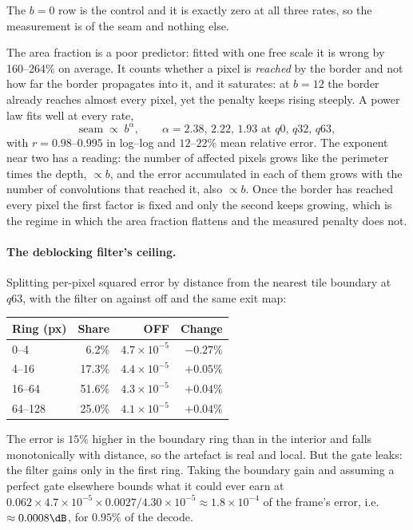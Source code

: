 The $b=0$ row is the control and it is exactly zero at all three rates, so the
measurement is of the seam and nothing else.

The area fraction is a poor predictor: fitted with one free scale it is wrong by
160--264\% on average. It counts whether a pixel is \emph{reached} by the border
and not how far the border propagates into it, and it saturates: at $b=12$
the border already reaches almost every pixel, yet the penalty keeps rising
steeply. A power law fits well at every rate,
\begin{equation}
\text{seam} \;\propto\; b^{\alpha}, \qquad
\alpha = 2.38,\, 2.22,\, 1.93 \text{ at } q0,\, q32,\, q63,
\end{equation}
with $r = 0.98$--$0.995$ in log--log and $12$--$22\%$ mean relative error. The
exponent near two has a reading: the number of affected pixels grows like the
perimeter times the depth, $\propto b$, and the error accumulated in each of them
grows with the number of convolutions that reached it, also $\propto b$. Once
the border has reached every pixel the first factor is fixed and only the second keeps
growing, which is the regime in which the area fraction flattens and the
measured penalty does not.

\paragraph{The deblocking filter's ceiling.} Splitting per-pixel squared error
by distance from the nearest tile boundary at $q63$, with the filter on against
off and
the same exit map:

\begin{center}
\begin{tabular}{lrrr}
\toprule
Ring (px) & Share & OFF & Change \\
\midrule
0--4    & 6.2\%  & $4.7\times10^{-5}$ & $-0.27\%$ \\
4--16   & 17.3\% & $4.4\times10^{-5}$ & $+0.05\%$ \\
16--64  & 51.6\% & $4.3\times10^{-5}$ & $+0.04\%$ \\
64--128 & 25.0\% & $4.1\times10^{-5}$ & $+0.04\%$ \\
\bottomrule
\end{tabular}
\end{center}

The error is $15\%$ higher in the boundary ring than in the interior and falls
monotonically with distance, so the artefact is real and local. But the gate
leaks: the filter gains only in the first ring. Taking the boundary gain and
assuming a perfect gate elsewhere bounds what it could ever earn at
$0.062 \times 4.7\!\times\!10^{-5} \times 0.0027 / 4.30\!\times\!10^{-5}
\approx 1.8\times10^{-4}$ of the frame's error, i.e. $\approx 0.0008\dB$, for
$0.95\%$ of the decode.

